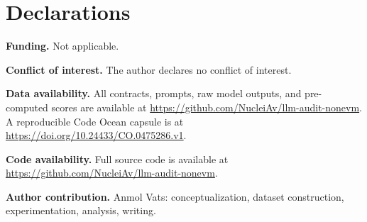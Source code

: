 \documentclass[runningheads]{llncs}
\begin{document}
\section*{Declarations}

\textbf{Funding.} Not applicable.

\textbf{Conflict of interest.} The author declares no conflict of interest.

\textbf{Data availability.} All contracts, prompts, raw model outputs, and
pre-computed scores are available at
\url{https://github.com/NucleiAv/llm-audit-nonevm}.
A reproducible Code Ocean capsule is at
\url{https://doi.org/10.24433/CO.0475286.v1}.

\textbf{Code availability.} Full source code is available at
\url{https://github.com/NucleiAv/llm-audit-nonevm}.

\textbf{Author contribution.} Anmol Vats: conceptualization, dataset
construction, experimentation, analysis, writing.



\end{document}
